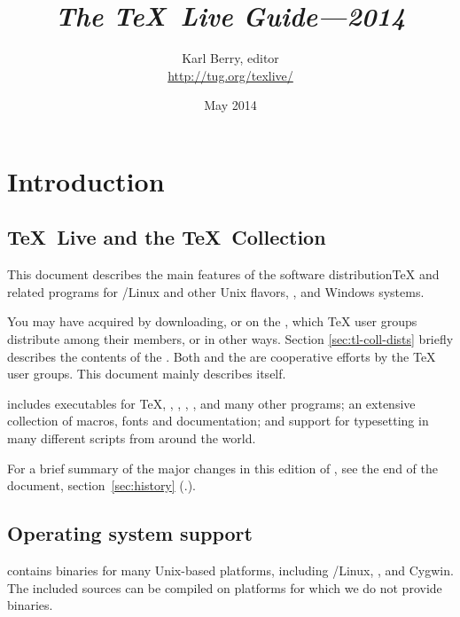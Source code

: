 \documentclass{article}
\begin{document}
\title{%
  {\huge \textit{The \TeX\ Live Guide---2014}}
}

\author{Karl Berry, editor \\[3mm]
        \url{http://tug.org/texlive/}
       }

\date{May 2014}

\maketitle

\begin{multicols}{2}
\tableofcontents
\end{multicols}

\section{Introduction}
\label{sec:intro}

\subsection{\TeX\ Live and the \TeX\ Collection}

This document describes the main features of the \TL{} software
distribution\Dash \TeX{} and related programs for \GNU/Linux
and other Unix flavors, \MacOSX, and Windows systems.

You may have acquired \TL{} by downloading, or on the \TK{} \DVD, which
\TeX{} user groups distribute among their members, or in other ways.
Section \ref{sec:tl-coll-dists} briefly describes the contents of the
\DVD.  Both \TL{} and the \TK{} are cooperative efforts by the \TeX{}
user groups. This document mainly describes \TL{} itself.

\TL{} includes executables for \TeX{}, \LaTeXe{}, \ConTeXt,
\MF, \MP, \BibTeX{} and many other programs; an extensive collection
of macros, fonts and documentation; and support for typesetting in
many different scripts from around the world.

For a brief summary of the major changes in this edition of \TL{},
see the end of the document, section~\ref{sec:history}
(\p.\pageref{sec:history}).


\subsection{Operating system support}
\label{sec:os-support}

\TL{} contains binaries for many Unix-based platforms, including
\GNU/Linux, \MacOSX, and Cygwin.  The included sources can be compiled
on platforms for which we do not provide binaries.
\end{document}
